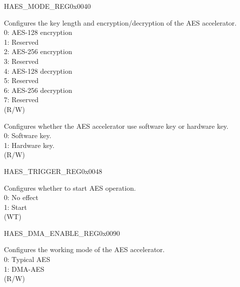 \begin{register}{H}{AES\_MODE\_REG}{0x0040}\label{regdesc:AESMODEREG}
%
%
%
%
\regnewline%
\begin{regdesc}\begin{reglist}
\label{fielddesc:AESMODE}\item [AES\_MODE] Configures the key length and encryption/decryption of the AES accelerator.\\
0: AES-128 encryption\\
1: Reserved\\
2: AES-256 encryption\\
3: Reserved\\
4: AES-128 decryption\\
5: Reserved\\
6: AES-256 decryption\\
7: Reserved\\ (R/W)
\label{fielddesc:AESUSEHARDWAREKEY}\item [AES\_USE\_HARDWARE\_KEY] Configures whether the AES accelerator use software key or hardware key.\\
0: Software key. \\
1: Hardware key. \\ (R/W)
\end{reglist}\end{regdesc}
\end{register}


\begin{register}{H}{AES\_TRIGGER\_REG}{0x0048}\label{regdesc:AESTRIGGERREG}
%
%
\regnewline%
\begin{regdesc}\begin{reglist}
\label{fielddesc:AESTRIGGER}\item [AES\_TRIGGER] Configures whether to start AES operation. \\
0: No effect\\
1: Start\\ (WT)
\end{reglist}\end{regdesc}
\end{register}


\begin{register}{H}{AES\_DMA\_ENABLE\_REG}{0x0090}\label{regdesc:AESDMAENABLEREG}
%
%
\regnewline%
\begin{regdesc}\begin{reglist}
\label{fielddesc:AESDMAENABLE}\item [AES\_DMA\_ENABLE] Configures the working mode of the AES accelerator. \\
0: Typical AES\\
1: DMA-AES\\ (R/W)
\end{reglist}\end{regdesc}
\end{register}


